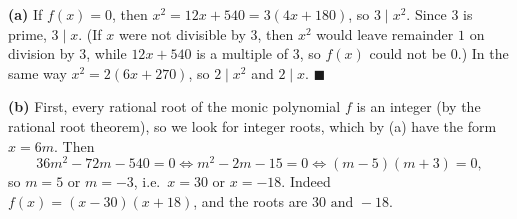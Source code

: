 \textbf{(a)} If $f(x)=0$, then $x^2=12x+540=3(4x+180)$, so $3\mid x^2$. Since $3$ is prime, $3\mid x$. (If $x$ were not divisible by $3$, then $x^2$ would leave remainder $1$ on division by $3$, while $12x+540$ is a multiple of $3$, so $f(x)$ could not be $0$.) In the same way $x^2=2(6x+270)$, so $2\mid x^2$ and $2\mid x$. $\blacksquare$

\textbf{(b)} First, every rational root of the monic polynomial $f$ is an integer (by the rational root theorem), so we look for integer roots, which by (a) have the form $x=6m$. Then
\[
36m^2-72m-540=0\iff m^2-2m-15=0\iff(m-5)(m+3)=0 ,
\]
so $m=5$ or $m=-3$, i.e.\ $x=30$ or $x=-18$. Indeed $f(x)=(x-30)(x+18)$, and the roots are $\boxed{30\text{ and }-18}$.
